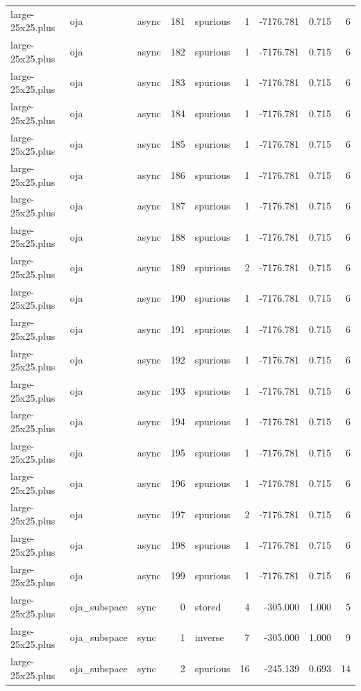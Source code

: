 \begin{tabular}{lllrlrrrr}
large-25x25.plus & oja & async & 181 & spurious & 1 & -7176.781 & 0.715 & 6 \\
large-25x25.plus & oja & async & 182 & spurious & 1 & -7176.781 & 0.715 & 6 \\
large-25x25.plus & oja & async & 183 & spurious & 1 & -7176.781 & 0.715 & 6 \\
large-25x25.plus & oja & async & 184 & spurious & 1 & -7176.781 & 0.715 & 6 \\
large-25x25.plus & oja & async & 185 & spurious & 1 & -7176.781 & 0.715 & 6 \\
large-25x25.plus & oja & async & 186 & spurious & 1 & -7176.781 & 0.715 & 6 \\
large-25x25.plus & oja & async & 187 & spurious & 1 & -7176.781 & 0.715 & 6 \\
large-25x25.plus & oja & async & 188 & spurious & 1 & -7176.781 & 0.715 & 6 \\
large-25x25.plus & oja & async & 189 & spurious & 2 & -7176.781 & 0.715 & 6 \\
large-25x25.plus & oja & async & 190 & spurious & 1 & -7176.781 & 0.715 & 6 \\
large-25x25.plus & oja & async & 191 & spurious & 1 & -7176.781 & 0.715 & 6 \\
large-25x25.plus & oja & async & 192 & spurious & 1 & -7176.781 & 0.715 & 6 \\
large-25x25.plus & oja & async & 193 & spurious & 1 & -7176.781 & 0.715 & 6 \\
large-25x25.plus & oja & async & 194 & spurious & 1 & -7176.781 & 0.715 & 6 \\
large-25x25.plus & oja & async & 195 & spurious & 1 & -7176.781 & 0.715 & 6 \\
large-25x25.plus & oja & async & 196 & spurious & 1 & -7176.781 & 0.715 & 6 \\
large-25x25.plus & oja & async & 197 & spurious & 2 & -7176.781 & 0.715 & 6 \\
large-25x25.plus & oja & async & 198 & spurious & 1 & -7176.781 & 0.715 & 6 \\
large-25x25.plus & oja & async & 199 & spurious & 1 & -7176.781 & 0.715 & 6 \\
large-25x25.plus & oja\_subspace & sync & 0 & stored & 4 & -305.000 & 1.000 & 5 \\
large-25x25.plus & oja\_subspace & sync & 1 & inverse & 7 & -305.000 & 1.000 & 9 \\
large-25x25.plus & oja\_subspace & sync & 2 & spurious & 16 & -245.139 & 0.693 & 14 \\

\end{tabular}
